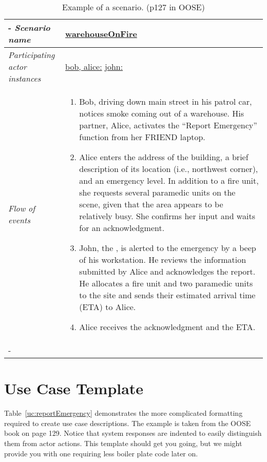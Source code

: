 %
%
\begin{table}[h!]
\tabulinesep=1.5mm
\begin{tabu} to 
	\tabucline[1.5pt]-
	\textit{Scenario name} & \underline{warehouseOnFire} \\
	\hline
	\textit{Participating actor \newline instances} & \underline{bob, alice:\fieldofficer} \newline \underline{john:\dispatcher} \\
	\hline
	\textit{Flow of events} &
	\vspace{-3mm}
	\begin{enumerate}[leftmargin=*,topsep=0pt,itemsep=-1ex]
		\item Bob, driving down main street in his patrol car, notices smoke coming out of a warehouse. His partner, Alice, activates the ``Report Emergency'' function from her FRIEND laptop.
		\item Alice enters the address of the building, a brief description of its location (i.e., northwest corner), and an emergency level. In addition to a fire unit, she requests several paramedic units on the scene, given that the area appears to be relatively busy. She confirms her input and waits for an acknowledgment.
		\item John, the \dispatcher, is alerted to the emergency by a beep of his workstation. He reviews the information submitted by Alice and acknowledges the report. He allocates a fire unit and two paramedic units to the \incident site and sends their estimated arrival time (ETA) to Alice.
		\item Alice receives the acknowledgment and the ETA.
	\end{enumerate} \\
	\tabucline[1.5pt]-
\end{tabu}
\caption{Example of a scenario. (p127 in OOSE)}
\label{sc:warehouseOnFire}
\end{table}

\clearpage
\section{Use Case Template}
Table~\ref{uc:reportEmergency} demonstrates the more complicated formatting required to create use case descriptions. The example is taken from the OOSE book on page 129. Notice that system responses are indented to easily distinguish them from actor actions. This template should get you going, but we might provide you with one requiring less boiler plate code later on.

